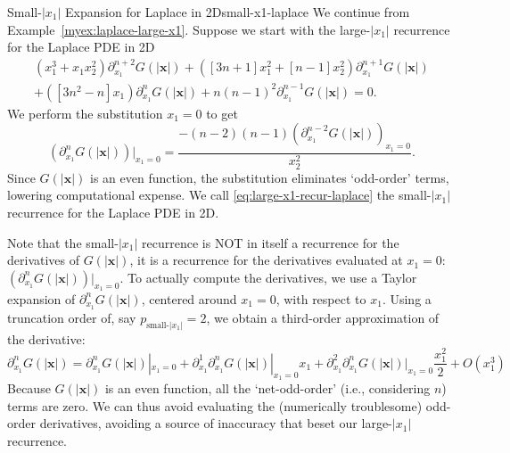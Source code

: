 \documentclass[12pt]{article}
\let\b=\boldsymbol
\theoremstyle{definition}
\theoremstyle{plain}
\theoremstyle{definition}
\begin{document}
\begin{myexample}{Small-$|x_1|$ Expansion for Laplace in 2D}{small-x1-laplace}
We continue from Example~\ref{myex:laplace-large-x1}. Suppose we start with the large-$|x_1|$ recurrence for the Laplace PDE in 2D
\[
\begin{aligned}
(x_1^3 + x_1 x_2^2) \partial^{n+2}_{x_1} G(|\b{x}|) + ([3n + 1] x_1^2 + [n-1] x_2^2) \partial^{n+1}_{x_1} G(|\b{x}|)\\ +([3n^2 - n] x_1)\partial^{n}_{x_1} G(|\b{x}|) + n(n-1)^2 \partial^{n-1}_{x_1} G(|\b{x}|)= 0.
\end{aligned}
\]
We perform the substitution $x_1 = 0$ to get
\begin{equation}
\label{eq:large-x1-recur-laplace}
\left(\partial^n_{x_1} G(|\b{x}|) \right)|_{x_1 = 0} = \frac{-(n-2)(n-1)\left(\partial^{n-2}_{x_1} G(|\b{x}|)\right)_{x_1=0}}{x_2^2}.
\end{equation}
Since $G(|\b x|)$ is an even function, the substitution eliminates `odd-order' terms, lowering computational expense. We call \eqref{eq:large-x1-recur-laplace} the small-$|x_1|$ recurrence for the Laplace PDE in 2D.

Note that the small-$|x_1|$ recurrence is NOT in itself a recurrence for the derivatives of $G(|\b{x}|)$, it is a recurrence for the derivatives evaluated at $x_1 = 0$: $\left(\partial^n_{x_1} G(|\b{x}|) \right)|_{x_1 = 0}$. To actually compute the derivatives, we use a Taylor expansion of $\partial^n_{x_1} G(|\b{x}|)$, centered around $x_1=0$, with respect to $x_1$.  Using a truncation order of, say $p_{\text{small-$|x_1|$}} = 2$, we obtain a third-order approximation of the derivative:\[
\partial^n_{x_1} G(|\b{x}|) = \partial^n_{x_1}G(|\b{x}|)|_{x_1=0}+  \partial^{1}_{x_1} \partial^n_{x_1}G(|\b{x}|)|_{x_1=0} x_1 + \partial^{2}_{x_1} \partial^n_{x_1}G(|\b{x}|)|_{x_1=0} \frac{x_1^2}{2} + O(x_1^3)
\]
Because $G(|\b x|)$ is an even function, all the `net-odd-order' (i.e., considering $n$) terms are zero. We can thus avoid evaluating the (numerically troublesome) odd-order derivatives, avoiding a source of inaccuracy that beset our large-$|x_1|$ recurrence.
\end{myexample}
\end{document}
